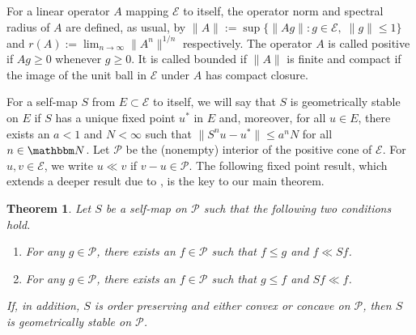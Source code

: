 \documentclass[12pt, reqno]{amsart}
\renewcommand{\leq}{\leqslant}
\renewcommand{\geq}{\geqslant}
\newcommand{\setntn}[2]{ \{ #1 : #2 \} }
\newcommand{\1}{\mathbbm 1}
\newcommand{\eE}{\mathcal E}
\newcommand{\pP}{\mathcal P}
\newcommand{\NN}{\mathbbm N}
\theoremstyle{plain}
\newtheorem{theorem}{Theorem}[section]
\theoremstyle{definition}
\begin{document}
For a linear operator $A$ mapping $\eE$ to itself, the operator
norm and spectral radius of $A$  are defined, as usual, by $\|A\| := \sup
\setntn{\|Ag\|}{g \in \eE ,\; \| g \| \leq 1}$ and $r(A) := \lim_{n \to
\infty} \| A^n \|^{1/n}$ respectively.   The operator $A$ is called
positive if $Ag \geq 0$ whenever $g \geq 0$.  It is called
bounded if $\| A \|$ is finite and compact if the image of the
unit ball in $\eE$ under $A$ has compact closure.

For a self-map $S$ from $E \subset \eE$ to itself, we will say that $S$ is
geometrically stable on $E$ if $S$ has a unique fixed point $u^*$ in $E$ and,
moreover, for all $u \in E$, there exists an $a < 1$ and $N < \infty$ such
that $\| S^n u - u^* \| \leq a^n N$ for all $n \in \NN$.  Let $\pP$ be the
(nonempty) interior of the positive cone of $\eE$. For $u, v \in \eE$, we
write $u \ll v$ if $v - u \in \pP$. The following fixed point result, which
extends a deeper result due to \cite{du1990fixed}, is the key to our main
theorem. 

\begin{theorem}\label{t:du}
    Let $S$ be a self-map on $\pP$ such that the following two conditions hold.
    \begin{enumerate}
        \item For any $g \in \pP$, there exists an $f \in \pP$ such that $f \leq g$ and $f \ll Sf$.
        \item For any $g \in \pP$, there exists an $f \in \pP$ such that $g \leq f$ and $Sf \ll f$.
    \end{enumerate}
    If, in addition, $S$ is order preserving and either convex or concave on
    $\pP$, then $S$ is geometrically stable on $\pP$.
\end{theorem}
\end{document}
